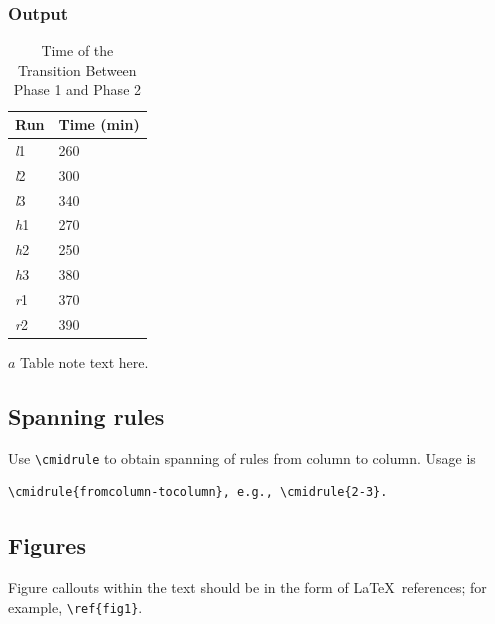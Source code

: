 \documentclass[]{imag-ms-template}
\begin{document}
\subsubsection*{Output}

\begin{table}[h!]
\begin{threeparttable}
\caption{Time of the Transition Between Phase 1 and Phase 2
\label{tab:label}}
\setlength{\tabcolsep}{45pt}%
\begin{tabular}{@{}ll}
\toprule
 Run  & Time (min)  \\
\midrule
  \textit{l}1  & 260   \\
  \textit{l}2  & 300   \\
  \textit{l}3  & 340   \\
  \textit{h}1  & 270   \\
  \textit{h}2  & 250   \\
  \textit{h}3  & 380   \\
  \textit{r}1  & 370   \\
  \textit{r}2  & 390   \\
\bottomrule
\end{tabular}
\begin{tablenotes}[flushleft]\footnotesize
\item[${a}$]Table note text here.
\end{tablenotes}
\end{threeparttable}
\end{table}

\subsection*{Spanning rules}

Use \verb!\cmidrule! to obtain spanning of rules from column to
column. Usage is

\begin{verbatim}
\cmidrule{fromcolumn-tocolumn}, e.g., \cmidrule{2-3}.
\end{verbatim}

\subsection{Figures}

Figure callouts within the text should be
in the form of \LaTeX\ references; for example, \verb+\ref{fig1}+.

\end{document}
